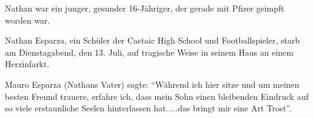 Nathan war ein junger, gesunder 16-Jähriger, der gerade mit Pfizer geimpft
worden war.

Nathan Esparza, ein Schüler der Castaic High School und Footballspieler, starb
am Dienstagabend, den 13. Juli, auf tragische Weise in seinem Haus an einem
Herzinfarkt.

Mauro Esparza (Nathans Vater) sagte: ``Während ich hier sitze und um meinen
besten Freund trauere, erfahre ich, dass mein Sohn einen bleibenden Eindruck auf
so viele erstaunliche Seelen hinterlassen hat.....das bringt mir eine Art
Trost''.
